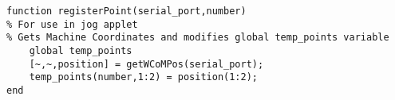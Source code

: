 \begin{lstlisting}
function registerPoint(serial_port,number)
% For use in jog applet
% Gets Machine Coordinates and modifies global temp_points variable
    global temp_points
    [~,~,position] = getWCoMPos(serial_port);
    temp_points(number,1:2) = position(1:2);
end
\end{lstlisting}